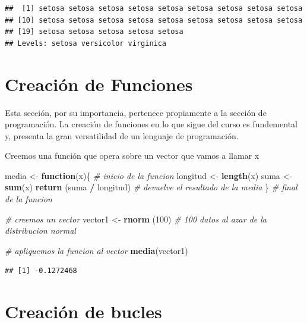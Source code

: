 \documentclass[
]{book}
\newenvironment{Shaded}{\begin{snugshade}}{\end{snugshade}}
\newcommand{\CommentTok}[1]{\textcolor[rgb]{0.56,0.35,0.01}{\textit{#1}}}
\newcommand{\ControlFlowTok}[1]{\textcolor[rgb]{0.13,0.29,0.53}{\textbf{#1}}}
\newcommand{\DecValTok}[1]{\textcolor[rgb]{0.00,0.00,0.81}{#1}}
\newcommand{\KeywordTok}[1]{\textcolor[rgb]{0.13,0.29,0.53}{\textbf{#1}}}
\newcommand{\NormalTok}[1]{#1}
\newcommand{\OperatorTok}[1]{\textcolor[rgb]{0.81,0.36,0.00}{\textbf{#1}}}
\newcommand{\StringTok}[1]{\textcolor[rgb]{0.31,0.60,0.02}{#1}}
\begin{document}
\begin{verbatim}
##  [1] setosa setosa setosa setosa setosa setosa setosa setosa setosa
## [10] setosa setosa setosa setosa setosa setosa setosa setosa setosa
## [19] setosa setosa setosa setosa setosa
## Levels: setosa versicolor virginica
\end{verbatim}

\hypertarget{creaciuxf3n-de-funciones}{%
\chapter{Creación de Funciones}\label{creaciuxf3n-de-funciones}}

Esta sección, por su importancia, pertenece propiamente a la sección de programación. La creación de funciones en lo que sigue del curso es fundemental y, presenta la gran versatilidad de un lenguaje de programación.

Creemos una función que opera sobre un vector que vamos a llamar x

\begin{Shaded}
\begin{Highlighting}[]
\NormalTok{media <-}\StringTok{ }\ControlFlowTok{function}\NormalTok{(x)\{     }\CommentTok{# inicio de la funcion}
\NormalTok{ longitud <-}\StringTok{ }\KeywordTok{length}\NormalTok{(x)}
\NormalTok{ suma <-}\StringTok{ }\KeywordTok{sum}\NormalTok{(x)}
 \KeywordTok{return}\NormalTok{ (suma }\OperatorTok{/}\StringTok{ }\NormalTok{longitud) }\CommentTok{# devuelve el resultado de la media}
\NormalTok{\}                         }\CommentTok{# final de la funcion}


\CommentTok{# creemos un vector}
\NormalTok{vector1 <-}\StringTok{ }\KeywordTok{rnorm}\NormalTok{ (}\DecValTok{100}\NormalTok{) }\CommentTok{# 100 datos al azar de la distribucion normal}

\CommentTok{# apliquemos la funcion al vector}
\KeywordTok{media}\NormalTok{(vector1)}
\end{Highlighting}
\end{Shaded}

\begin{verbatim}
## [1] -0.1272468
\end{verbatim}

\hypertarget{creaciuxf3n-de-bucles}{%
\chapter{Creación de bucles}\label{creaciuxf3n-de-bucles}}
\end{document}
